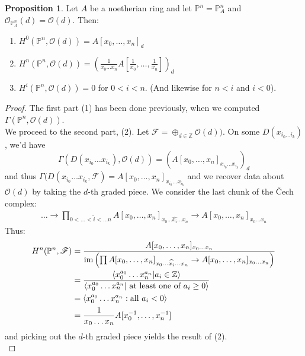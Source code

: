 \documentclass[10pt,reqno]{amsart}
\theoremstyle{definition}
\newtheorem{proposition}[theorem]{Proposition}
\theoremstyle{remark}
\numberwithin{equation}{section}
\numberwithin{theorem}{section}
\newcommand{\Z}{{\mathbb Z}}
\newcommand{\OO}{{\mathcal O}}
\newcommand{\FF}{{\mathscr F}}
\newcommand{\PP}{{\mathbb P}}
\begin{document}
\begin{proposition} Let $A$ be a noetherian ring and let $\PP^n = \PP^n_A$ and $\OO_{\PP^n_A}(d) = \OO(d)$. Then:
\begin{enumerate}
\item $H^0(\PP^n,\OO(d)) = A[x_0,\dots,x_n]_d$
\item $H^n(\PP^n,\OO(d)) = \left(\frac{1}{x_0 \dots x_n} A[\frac{1}{x_0},\dots,\frac{1}{x_n}]\right)_{d}$
\item $H^i(\PP^n,\OO(d)) = 0$ for $0 < i < n$. (And likewise for $n< i$ and $i < 0$).
\end{enumerate}
\end{proposition}
\begin{proof}
The first part (1) has been done previously, when we computed $\Gamma(\PP^n,\OO(d))$. 
\\

We proceed to the second part, (2). Let $\FF = \oplus_{d \in \Z} \OO(d))$. On some $D(x_{i_0 \dots i_k})$, we'd have 
\[\Gamma(D(x_{i_0} \dots x_{i_k}), \OO(d)) = \left(A[x_0,\dots,x_n]_{x_{i_0} \dots x_{i_k}}\right)_d\]
and thus $\Gamma(D(x_{i_0} \dots x_{i_k}, \FF) = A[x_0,\dots,x_n]_{x_{i_0} \dots x_{i_k}}$ and we recover data about $\OO(d)$ by taking the $d$-th graded piece. We consider the last chunk of the \v Cech complex:
\begin{align*}
\dots \to \prod_{0 < \dots < \hat{i} < \dots n} A[x_0,\dots,x_n]_{x_0 \dots \widehat{x_i} \dots x_n} \to A[x_0,\dots,x_n]_{x_0 \dots x_n}
\end{align*}
Thus:
\begin{align*}
H^n(\PP^n, \FF) &= \frac{A[x_0,\dots,x_n]_{x_0 \dots x_n}}{\textup{im} \left(\prod A[x_0,\dots,x_n]_{x_0 \dots \widehat{x_i} \dots x_n} \to A[x_0,\dots,x_n]_{x_0 \dots x_n}\right)}\\
&= \frac{\langle x_0^{a_0} \dots x_n^{a_n} | a_i \in \Z \rangle}{\langle x_0^{a_0} \dots x_n^{a_n} | \textup{ at least one of $a_i \ge 0$}\rangle}\\
&= \langle x_0^{a_0} \dots x_n^{a_n} : \textup{all $a_i < 0$}\rangle\\
&= \frac{1}{x_0 \dots x_n} A[x_0^{-1}, \dots, x_n^{-1}]
\end{align*}
and picking out the $d$-th graded piece yields the result of (2).
\\


\end{proof}
\end{document}
